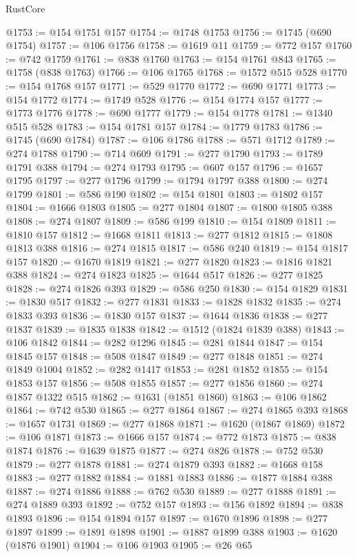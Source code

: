 \begin{lexlean}{RustCore}
\begin{coremodule}
@1753 := @154 @1751 @157
@1754 := @1748 @1753
@1756 := @1745 (@690 @1754)
@1757 := @106 @1756
@1758 := @1619 @11
@1759 := @772 @157
@1760 := @742 @1759
@1761 := @838 @1760
@1763 := @154 @1761 @843
@1765 := @1758 (@838 @1763)
@1766 := @106 @1765
@1768 := @1572 @515 @528
@1770 := @154 @1768 @157
@1771 := @529 @1770
@1772 := @690 @1771
@1773 := @154 @1772
@1774 := @1749 @528
@1776 := @154 @1774 @157
@1777 := @1773 @1776
@1778 := @690 @1777
@1779 := @154 @1778
@1781 := @1340 @515 @528
@1783 := @154 @1781 @157
@1784 := @1779 @1783
@1786 := @1745 (@690 @1784)
@1787 := @106 @1786
@1788 := @571 @1712
@1789 := @274 @1788
@1790 := @714 @609
@1791 := @277 @1790
@1793 := @1789 @1791 @388
@1794 := @274 @1793
@1795 := @607 @157
@1796 := @1657 @1795
@1797 := @277 @1796
@1799 := @1794 @1797 @388
@1800 := @274 @1799
@1801 := @586 @190
@1802 := @154 @1801
@1803 := @1802 @157
@1804 := @1666 @1803
@1805 := @277 @1804
@1807 := @1800 @1805 @388
@1808 := @274 @1807
@1809 := @586 @199
@1810 := @154 @1809
@1811 := @1810 @157
@1812 := @1668 @1811
@1813 := @277 @1812
@1815 := @1808 @1813 @388
@1816 := @274 @1815
@1817 := @586 @240
@1819 := @154 @1817 @157
@1820 := @1670 @1819
@1821 := @277 @1820
@1823 := @1816 @1821 @388
@1824 := @274 @1823
@1825 := @1644 @517
@1826 := @277 @1825
@1828 := @274 @1826 @393
@1829 := @586 @250
@1830 := @154 @1829
@1831 := @1830 @517
@1832 := @277 @1831
@1833 := @1828 @1832
@1835 := @274 @1833 @393
@1836 := @1830 @157
@1837 := @1644 @1836
@1838 := @277 @1837
@1839 := @1835 @1838
@1842 := @1512 (@1824 @1839 @388)
@1843 := @106 @1842
@1844 := @282 @1296
@1845 := @281 @1844
@1847 := @154 @1845 @157
@1848 := @508 @1847
@1849 := @277 @1848
@1851 := @274 @1849 @1004
@1852 := @282 @1417
@1853 := @281 @1852
@1855 := @154 @1853 @157
@1856 := @508 @1855
@1857 := @277 @1856
@1860 := @274 @1857 @1322 @515
@1862 := @1631 (@1851 @1860)
@1863 := @106 @1862
@1864 := @742 @530
@1865 := @277 @1864
@1867 := @274 @1865 @393
@1868 := @1657 @1731
@1869 := @277 @1868
@1871 := @1620 (@1867 @1869)
@1872 := @106 @1871
@1873 := @1666 @157
@1874 := @772 @1873
@1875 := @838 @1874
@1876 := @1639 @1875
@1877 := @274 @826
@1878 := @752 @530
@1879 := @277 @1878
@1881 := @274 @1879 @393
@1882 := @1668 @158
@1883 := @277 @1882
@1884 := @1881 @1883
@1886 := @1877 @1884 @388
@1887 := @274 @1886
@1888 := @762 @530
@1889 := @277 @1888
@1891 := @274 @1889 @393
@1892 := @752 @157
@1893 := @156 @1892
@1894 := @838 @1893
@1896 := @154 @1894 @157
@1897 := @1670 @1896
@1898 := @277 @1897
@1899 := @1891 @1898
@1901 := @1887 @1899 @388
@1903 := @1620 (@1876 @1901)
@1904 := @106 @1903
@1905 := @26 @65

\end{coremodule}
\end{lexlean}
